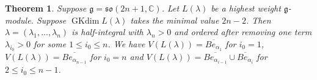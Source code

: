 \documentclass{amsart}[12pt]
\newtheorem{Thm}[Lem]{Theorem}
\newcommand{\gkd}{\operatorname{GKdim}}
\numberwithin{equation}{section}
\begin{document}
\begin{Thm}
	Suppose $\mathfrak{g}=\mathfrak{so }(2n+1, \mathbb{C})$. Let $L(\lambda)$ be a highest weight $\mathfrak{g}$-module. Suppose $\gkd L(\lambda)$ takes the minimal value $2n-2$. Then
	$\lambda=(\lambda_1,...,\lambda_n)$ is half-integral with $\lambda_n>0$ and ordered  after removing one term $\lambda_{i_0}>0$ for some $1\leq i_0\leq n$.
	We have	$V(L(\lambda))=\overline{Be_{\alpha_{1}}}$ for $i_0=1$, $V(L(\lambda))=\overline{Be_{\alpha_{n-1}}}$ for $i_0=n$ and $V(L(\lambda))=\overline{Be_{\alpha_{i-1}}}\cup \overline{Be_{\alpha_{i}}}$ for $2\leq i_0\leq n-1$.
	
	
%	
	

\end{Thm}
\end{document}
